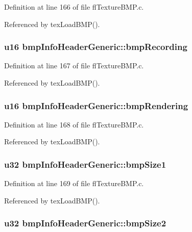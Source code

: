 Definition at line 166 of file fl\-Texture\-BMP.c.

Referenced by tex\-Load\-BMP().
\subsubsection{\setlength{\rightskip}{0pt plus 5cm}u16 {\bf bmp\-Info\-Header\-Generic::bmp\-Recording}}\label{structbmpInfoHeaderGeneric_5d61eb90086d372cc9aef8d42692390f}




Definition at line 167 of file fl\-Texture\-BMP.c.

Referenced by tex\-Load\-BMP().
\subsubsection{\setlength{\rightskip}{0pt plus 5cm}u16 {\bf bmp\-Info\-Header\-Generic::bmp\-Rendering}}\label{structbmpInfoHeaderGeneric_515cd6ddf72bdec56748755ce2b0a2bd}




Definition at line 168 of file fl\-Texture\-BMP.c.

Referenced by tex\-Load\-BMP().
\subsubsection{\setlength{\rightskip}{0pt plus 5cm}u32 {\bf bmp\-Info\-Header\-Generic::bmp\-Size1}}\label{structbmpInfoHeaderGeneric_ac8147952ae0d31ffbc84d17e73a9c8d}




Definition at line 169 of file fl\-Texture\-BMP.c.

Referenced by tex\-Load\-BMP().
\subsubsection{\setlength{\rightskip}{0pt plus 5cm}u32 {\bf bmp\-Info\-Header\-Generic::bmp\-Size2}}\label{structbmpInfoHeaderGeneric_273a6a5616c07d96be4b9fd175414dc0}




